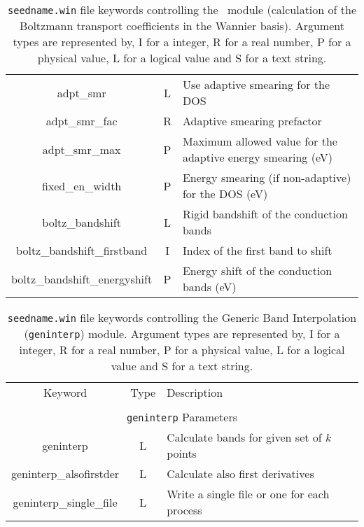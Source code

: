 \begin{table}[h!]
\begin{center}
\begin{tabular}{|c|c|p{6cm}|}
{adpt\_smr} & L & Use adaptive smearing for the DOS \\
{adpt\_smr\_fac} & R & Adaptive smearing prefactor\\
{adpt\_smr\_max} & P & Maximum allowed value for the
adaptive energy smearing (eV)\\
{fixed\_en\_width} & P  & Energy smearing (if non-adaptive) for the DOS (eV) \\
{\sc boltz\_bandshift} & L & Rigid bandshift of the conduction bands\\
{\sc boltz\_bandshift\_firstband} & I & Index of the first band to shift\\
{\sc boltz\_bandshift\_energyshift} & P & Energy shift of the conduction bands (eV)\\
\hline
\end{tabular}
\caption[Parameter file keywords controlling the \bw\ module.]
{{\tt seedname.win} file keywords controlling the \bw\ module (calculation of the Boltzmann transport coefficients in the Wannier basis). Argument types
are represented by, I for a integer, R for a real number, P for a
physical value, L for a logical value and S for a text string.}
\label{parameter_keywords_bw}
\end{center}
\end{table}

\begin{table}[h!]
\begin{center}
\begin{tabular}{|c|c|p{6cm}|}
\hline
Keyword & Type & Description \\
        &      &             \\
\hline\hline
\multicolumn{3}{|c|}{{\tt geninterp} Parameters} \\
\hline
{\sc geninterp}   & L & Calculate bands for given set of $k$ points \\
{\sc geninterp\_alsofirstder} & L & Calculate also first derivatives\\ 
{\sc geninterp\_single\_file} & L & Write a single file or one for each
process\\ 
\hline
\end{tabular}
\caption[Parameter file keywords controlling the geninterp module.]
{{\tt seedname.win} file keywords controlling the Generic Band
  Interpolation ({\tt geninterp}) module. Argument types
are represented by, I for a integer, R for a real number, P for a
physical value, L for a logical value and S for a text string.}
\label{parameter_keywords_geninterp}
\end{center}
\end{table}

